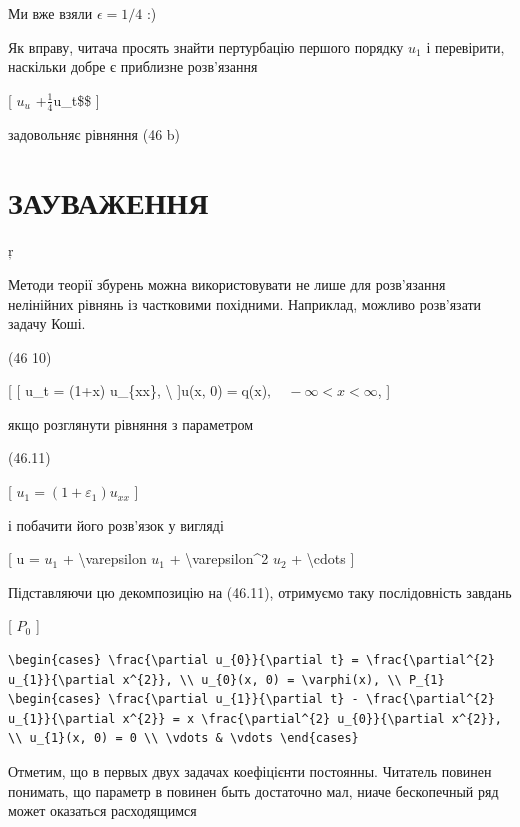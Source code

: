 \documentclass[
]{article}
\begin{document}
{{{Ми вже взяли \(\epsilon = 1/4\) :)

Як вправу, читача просять знайти пертурбацію першого порядку \(u_1\) і
перевірити, наскільки добре є приблизне розв'язання

{[} \(u_u\) +\(\frac{1}{4}\)u\_t\$\$ {]}

задовольняє рівняння (46 b)

\section{ЗАУВАЖЕННЯ}\label{ux437ux430ux443ux432ux430ux436ux435ux43dux43dux44f-7}

ŗ

Методи теорії збурень можна використовувати не лише для розв'язання
нелінійних рівнянь із частковими похідними. Наприклад, можливо
розв'язати задачу Коші.

(46 10)

{[} {[} u\_t = (1+x) u\_\{xx\}, \textbackslash{} {]}u(x,
0)\(=\)q(x)\(, \quad -\infty < x < \infty\), {]}

якщо розглянути рівняння з параметром

(46.11)

{[} \(u_1 = (1 + \varepsilon_1) u_{xx}\) {]}

і побачити його розв'язок у вигляді

{[} u = \(u_1\) + \textbackslash varepsilon \(u_1\) +
\textbackslash varepsilon\^{}2 \(u_2\) + \textbackslash cdots {]}

Підставляючи цю декомпозицію на (46.11), отримуємо таку послідовність
завдань

{[} \(P_{0}\) {]}

\begin{verbatim}
\begin{cases} \frac{\partial u_{0}}{\partial t} = \frac{\partial^{2} u_{1}}{\partial x^{2}}, \\ u_{0}(x, 0) = \varphi(x), \\ P_{1} \begin{cases} \frac{\partial u_{1}}{\partial t} - \frac{\partial^{2} u_{1}}{\partial x^{2}} = x \frac{\partial^{2} u_{0}}{\partial x^{2}}, \\ u_{1}(x, 0) = 0 \\ \vdots & \vdots \end{cases}
\end{verbatim}

Отметим, що в первых двух задачах коефіцієнти постоянны. Читатель
повинен понимать, що параметр в повинен быть достаточно мал, ниаче
бескопечный ряд может оказаться расходящимся

}}}
\end{document}

